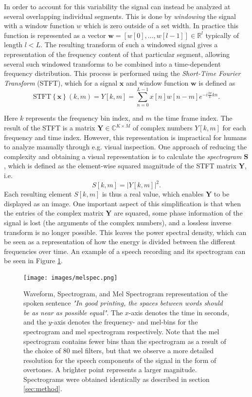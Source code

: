 \documentclass{report}
\begin{document}
In order to account for this variability the signal can instead be analyzed at several overlapping individual segments. This is done by \textit{windowing} the signal with a window function $w$ which is zero outside of a set width. In practice this function is represented as a vector $\bm{w}=[w[0],\dots, w[l-1]] \in \mathbb{R}^l$ typically of length $l<L$. The resulting transform of such a windowed signal gives a representation of the frequency content of that particular segment, allowing several such windowed transforms to be combined into a time-dependent frequency distribution. This process is performed using the \textit{Short-Time Fourier Transform} (STFT), which for a signal $\bm{x}$ and window function $\bm{w}$ is defined as
\begin{equation} \label{eq:spec}
    \text{STFT}\left\{ \bm{x} \right\}(k, m) = Y[k, m] = \sum_{n=0}^{L-1} x[n]w[n-m]e^{-i \frac{2\pi}{L}k n}.
\end{equation}

Here $k$ represents the frequency bin index, and $m$ the time frame index. The result of the STFT is a matrix $\bm{Y} \in \mathbb{C}^{K \times M}$ of complex numbers $Y[k, m]$ for each frequency and time index. However, this representation is impractical for humans to analyze manually through e.g. visual inspection. One approach of reducing the complexity and obtaining a visual representation is to calculate the \textit{spectrogram} $\bm{S}$, which is defined as the element-wise squared magnitude of the STFT matrix $\bm{Y}$, i.e.
\begin{equation}
    S[k, m] = \left| Y[k, m] \right|^2.
\end{equation}
Each resulting element $S[k, m]$ is thus a real value, which enables $\bm{Y}$ to be displayed as an image. One important aspect of this simplification is that when the entries of the complex matrix $\bm{Y}$ are squared, some phase information of the signal is lost (the arguments of the complex numbers), and a lossless inverse transform is no longer possible. This leaves the power spectral density, which can be seen as a representation of how the energy is divided between the different frequencies over time. An example of a speech recording and its spectrogram can be seen in Figure \ref{fig:melspec}.

\begin{figure}[H]
    \centering
    \texttt{[image: images/melspec.png]}
    \caption{\onehalfspacing Waveform, Spectrogram, and Mel Spectrogram representation of the spoken sentence \textit{"In good printing, the spaces between words should be as near as possible equal"}. The $x$-axis denotes the time in seconds, and the $y$-axis denotes the frequency- and mel-bins for the spectrogram and mel spectrogram respectively. Note that the mel spectrogram contains fewer bins than the spectrogram as a result of the choice of 80 mel filters, but that we observe a more detailed resolution for the speech components of the signal in the form of overtones. A brighter point represents a larger magnitude. Spectrograms were obtained identically as described in section \ref{sec:method}.}
    \label{fig:melspec}
\end{figure}
\end{document}
